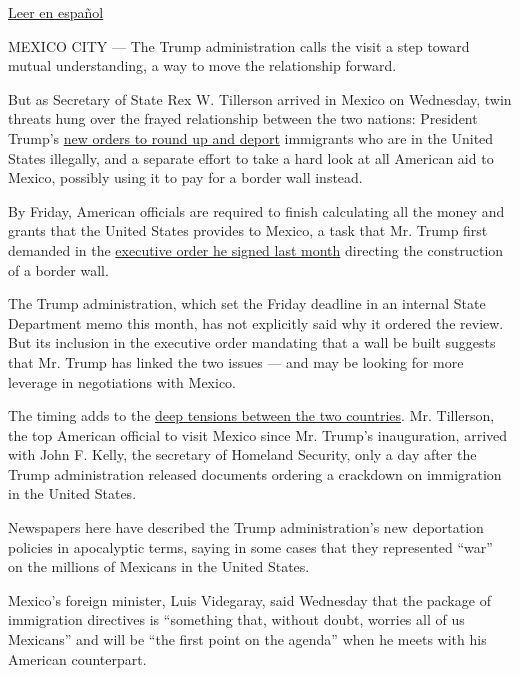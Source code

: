 \href{https://www.nytimes.com/es/2017/02/23/entre-amenazas-por-deportaciones-y-el-muro-rex-tillerson-visita-mexico/}{Leer
en español}

MEXICO CITY --- The Trump administration calls the visit a step toward
mutual understanding, a way to move the relationship forward.

But as Secretary of State Rex W. Tillerson arrived in Mexico on
Wednesday, twin threats hung over the frayed relationship between the
two nations: President Trump's
\href{https://www.nytimes.com/2017/02/21/us/politics/dhs-immigration-trump.html?_r=0}{new
orders to round up and deport} immigrants who are in the United States
illegally, and a separate effort to take a hard look at all American aid
to Mexico, possibly using it to pay for a border wall instead.

By Friday, American officials are required to finish calculating all the
money and grants that the United States provides to Mexico, a task that
Mr. Trump first demanded in the
\href{https://www.nytimes.com/2017/01/25/us/politics/refugees-immigrants-wall-trump.html}{executive
order he signed last month} directing the construction of a border wall.

The Trump administration, which set the Friday deadline in an internal
State Department memo this month, has not explicitly said why it ordered
the review. But its inclusion in the executive order mandating that a
wall be built suggests that Mr. Trump has linked the two issues --- and
may be looking for more leverage in negotiations with Mexico.

The timing adds to the
\href{https://www.nytimes.com/2017/01/26/world/americas/mexico-pena-nieto-donald-trump.html}{deep
tensions between the two countries}. Mr. Tillerson, the top American
official to visit Mexico since Mr. Trump's inauguration, arrived with
John F. Kelly, the secretary of Homeland Security, only a day after the
Trump administration released documents ordering a crackdown on
immigration in the United States.

Newspapers here have described the Trump administration's new
deportation policies in apocalyptic terms, saying in some cases that
they represented ``war'' on the millions of Mexicans in the United
States.

Mexico's foreign minister, Luis Videgaray, said Wednesday that the
package of immigration directives is ``something that, without doubt,
worries all of us Mexicans'' and will be ``the first point on the
agenda'' when he meets with his American counterpart.

